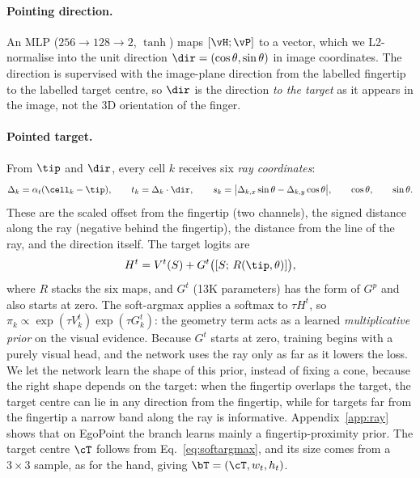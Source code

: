 \paragraph{Pointing direction.} An MLP ($256\to128\to2$, $\tanh$) maps $[\vH;\vP]$ to a vector, which we L2-normalise into the unit direction $\dir=(\cos\theta,\sin\theta)$ in image coordinates. The direction is supervised with the image-plane direction from the labelled fingertip to the labelled target centre, so $\dir$ is the direction \emph{to the target} as it appears in the image, not the 3D orientation of the finger.

\paragraph{Pointed target.} From $\tip$ and $\dir$, every cell $k$ receives six \emph{ray coordinates}:
\begin{equation}
\Delta_k=\alpha_t(\cell_k-\tip),\qquad
t_k=\Delta_k\cdot\dir,\qquad
s_k=\big|\Delta_{k,x}\sin\theta-\Delta_{k,y}\cos\theta\big|,\qquad
\cos\theta,\qquad \sin\theta .
\label{eq:raycoords}
\end{equation}
These are the scaled offset from the fingertip (two channels), the signed distance along the ray (negative behind the fingertip), the distance from the line of the ray, and the direction itself. The target logits are
\begin{equation}
H^t = V^t(S) + G^t\big([S;\,R(\tip,\theta)]\big),
\label{eq:target}
\end{equation}
where $R$ stacks the six maps, and $G^t$ (13K parameters) has the form of $G^p$ and also starts at zero. The soft-argmax applies a softmax to $\tau H^t$, so $\pi_k\propto\exp(\tau V^t_k)\exp(\tau G^t_k)$: the geometry term acts as a learned \emph{multiplicative prior} on the visual evidence. Because $G^t$ starts at zero, training begins with a purely visual head, and the network uses the ray only as far as it lowers the loss. We let the network learn the shape of this prior, instead of fixing a cone, because the right shape depends on the target: when the fingertip overlaps the target, the target centre can lie in any direction from the fingertip, while for targets far from the fingertip a narrow band along the ray is informative. Appendix~\ref{app:ray} shows that on EgoPoint the branch learns mainly a fingertip-proximity prior. The target centre $\cT$ follows from Eq.~\eqref{eq:softargmax}, and its size comes from a $3\times3$ sample, as for the hand, giving $\bT=(\cT,w_t,h_t)$.

